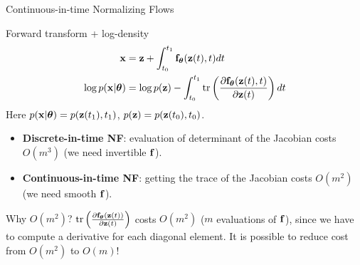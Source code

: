 \begin{frame}{Continuous-in-time Normalizing Flows}
	\begin{block}{Forward transform + log-density}
		\vspace{-0.7cm}
		\begin{align*}
				\mathbf{x} &= \mathbf{z} + \int_{t_0}^{t_1} \mathbf{f}_{\boldsymbol{\theta}}(\mathbf{z}(t), t) dt \\
				\log p(\mathbf{x} | \boldsymbol{\theta}) &= \log p(\mathbf{z}) - \int_{t_0}^{t_1} \text{tr} \left( \frac{\partial \mathbf{f}_{\boldsymbol{\theta}}(\mathbf{z}(t), t)}{\partial \mathbf{z}(t)} \right) dt
		\end{align*}
		Here $p(\mathbf{x} | \boldsymbol{\theta}) = p(\mathbf{z}(t_1), t_1)$, $p(\mathbf{z}) = p(\mathbf{z}(t_0), t_0)$.
	\end{block}
	\begin{itemize}
		\item \textbf{Discrete-in-time NF}: evaluation of determinant of the Jacobian costs $O(m^3)$ (we need invertible $\mathbf{f}$).
		\item \textbf{Continuous-in-time NF}: getting the trace of the Jacobian costs $O(m^2)$ (we need smooth $\mathbf{f}$).
	\end{itemize}
	\begin{block}{Why $O(m^2)$?}
		$\text{tr} \left( \frac{\partial \mathbf{f}_{\boldsymbol{\theta}}(\mathbf{z}(t))}{\partial \mathbf{z}(t)} \right)$ costs $O(m^2)$ ($m$ evaluations of $\mathbf{f}$), since we have to compute a derivative for each diagonal element. It is possible to reduce cost from $O(m^2)$ to $O(m)$!
	\end{block}
\end{frame}
